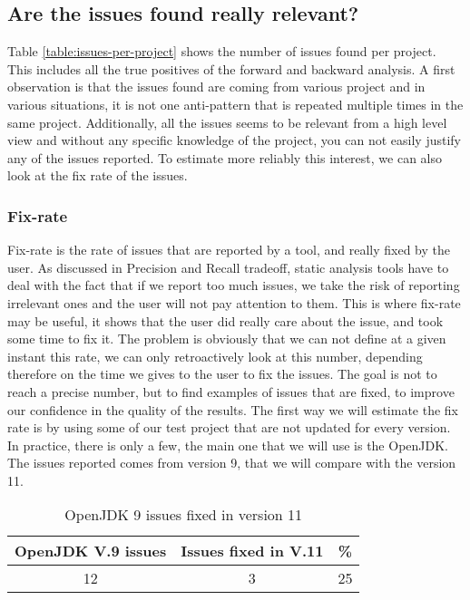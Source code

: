 \subsection{Are the issues found really relevant?}
\label{subsec:are_the_issues_relevant}

Table \ref{table:issues-per-project} shows the number of issues found per project. 
This includes all the true positives of the forward and backward analysis. 
A first observation is that the issues found are coming from various project and in various situations, it is not one anti-pattern that is repeated multiple times in the same project. Additionally, all the issues seems to be relevant from a high level view and without any specific knowledge of the project, you can not easily justify any of the issues reported. 
To estimate more reliably this interest, we can also look at the fix rate of the issues.

\subsubsection{Fix-rate}
\label{subsubsec:fix_rate}

Fix-rate is the rate of issues that are reported by a tool, and really fixed by the user. 
As discussed in Precision and Recall tradeoff, static analysis tools have to deal with the fact that if we report too much issues, we take the risk of reporting irrelevant ones and the user will not pay attention to them. 
This is where fix-rate may be useful, it shows that the user did really care about the issue, and took some time to fix it. \newline
The problem is obviously that we can not define at a given instant this rate, we can only retroactively look at this number, depending therefore on the time we gives to the user to fix the issues.
The goal is not to reach a precise number, but to find examples of issues that are fixed, to improve our confidence in the quality of the results.\newline
The first way we will estimate the fix rate is by using some of our test project that are not updated for every version. 
In practice, there is only a few, the main one that we will use is the OpenJDK. 
The issues reported comes from version 9, that we will compare with the version 11.

\begin{table}[h]
	\centering
	\caption{OpenJDK 9 issues fixed in version 11}
	\label{table:openJDK_issues}
	\begin{tabular}{|c|c|c|}
		\hline
		\bf OpenJDK V.9  issues & \bf Issues fixed in V.11 & \bf \% \\ \hline
		12 &  3 &  25 \\ \hline
	\end{tabular}
\end{table}

